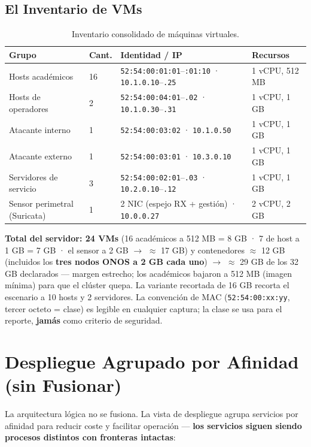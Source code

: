 \documentclass[11pt,a4paper]{report}
\begin{document}
\subsection{El Inventario de VMs}
\begin{table}[h!]
\centering
\small
\begin{tabularx}{\linewidth}{p{4.2cm}p{1.2cm}p{3.6cm}X}
\toprule
\textbf{Grupo} & \textbf{Cant.} & \textbf{Identidad / IP} & \textbf{Recursos} \\
\midrule
Hosts académicos & 16 & \texttt{52:54:00:01:01}--\texttt{:01:10} · \texttt{10.1.0.10}--\texttt{.25} & 1 vCPU, 512 MB \\
Hosts de operadores & 2 & \texttt{52:54:00:04:01}--\texttt{.02} · \texttt{10.1.0.30}--\texttt{.31} & 1 vCPU, 1 GB \\
Atacante interno & 1 & \texttt{52:54:00:03:02} · \texttt{10.1.0.50} & 1 vCPU, 1 GB \\
Atacante externo & 1 & \texttt{52:54:00:03:01} · \texttt{10.3.0.10} & 1 vCPU, 1 GB \\
Servidores de servicio & 3 & \texttt{52:54:00:02:01}--\texttt{.03} · \texttt{10.2.0.10}--\texttt{.12} & 1 vCPU, 1 GB \\
Sensor perimetral (Suricata) & 1 & 2 NIC (espejo RX + gestión) · \texttt{10.0.0.27} & 2 vCPU, 2 GB \\
\bottomrule
\end{tabularx}
\caption{Inventario consolidado de máquinas virtuales.}
\label{tab:vms}
\end{table}

\textbf{Total del servidor: 24 VMs} (16 académicos a 512 MB = 8 GB · 7 de host a 1 GB = 7 GB · el sensor a 2 GB $\rightarrow$ $\approx$ 17 GB) y contenedores $\approx$ 12 GB (incluidos los \textbf{tres nodos ONOS a 2 GB cada uno}) $\rightarrow$ $\approx$ 29 GB de los 32 GB declarados — margen estrecho; los académicos bajaron a 512 MB (imagen mínima) para que el clúster quepa. La variante recortada de 16 GB recorta el escenario a 10 hosts y 2 servidores. La convención de MAC (\texttt{52:54:00:xx:yy}, tercer octeto = clase) es legible en cualquier captura; la clase se usa para el reporte, \textbf{jamás} como criterio de seguridad.

\section{Despliegue Agrupado por Afinidad (sin Fusionar)}
La arquitectura lógica no se fusiona. La vista de despliegue agrupa servicios por afinidad para reducir coste y facilitar operación — \textbf{los servicios siguen siendo procesos distintos con fronteras intactas}:
\end{document}
